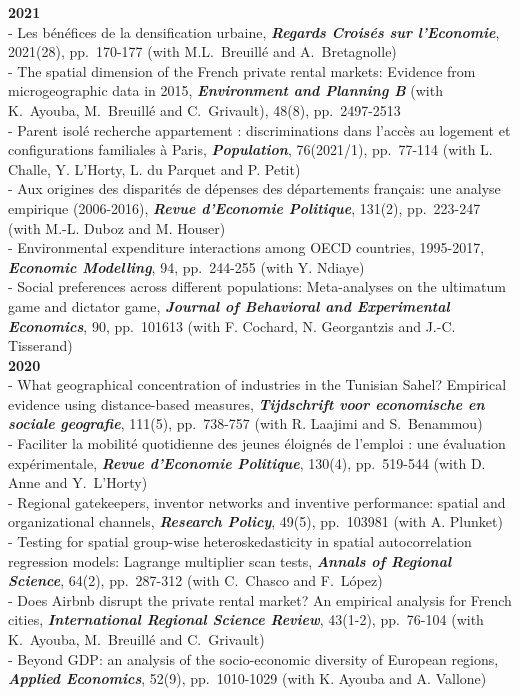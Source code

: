 \documentclass[a4paper,12pt]{article}
\begin{document}
\noindent \textbf{2021}  \smallskip \\ 
- Les bénéfices de la densification urbaine, \textit{\textbf{Regards Croisés sur l'Economie}}, 2021(28), pp.~170-177 (with M.L.~Breuillé and A.~Bretagnolle)\\
- The spatial dimension of the French private rental markets: Evidence from microgeographic data in 2015, \textit{\textbf{Environment and Planning B}} (with K.~Ayouba, M.~Breuillé and C.~Grivault), 48(8), pp.~2497-2513 \\
- Parent isolé recherche appartement : discriminations dans l'accès au logement et configurations familiales à Paris, \textit{\textbf{Population}}, 76(2021/1), pp.~77-114 (with L. Challe, Y. L'Horty, L. du Parquet and P. Petit) \\
- Aux origines des disparités de dépenses des départements fran\c cais: une analyse empirique (2006-2016), \textit{\textbf{Revue d'Economie Politique}}, 131(2), pp.~223-247 (with M.-L. Duboz and M. Houser) \\	
- Environmental expenditure interactions among OECD countries, 1995-2017, \textit{\textbf{Economic Modelling}}, 94, pp.~244-255 (with Y. Ndiaye) \\
- Social preferences across different populations: Meta-analyses on the ultimatum game and dictator game, \textit{\textbf{Journal of Behavioral and Experimental Economics}}, 90, pp.~101613 (with F. Cochard, N. Georgantzis and J.-C. Tisserand) \\

\noindent \textbf{2020}  \smallskip \\ 
- What geographical concentration of industries in the Tunisian Sahel? Empirical evidence using distance-based measures, \textit{\textbf{Tijdschrift voor economische en sociale geografie}}, 111(5), pp.~738-757  (with R. Laajimi and S.~Benammou) \\
- Faciliter la mobilité quotidienne des jeunes éloignés de l'emploi : une évaluation expérimentale, \textit{\textbf{Revue d'Economie Politique}}, 130(4), pp.~519-544 (with D. Anne and Y.~L'Horty)\\
- Regional gatekeepers, inventor networks and inventive performance: spatial and organizational channels, \textit{\textbf{Research Policy}}, 49(5), pp.~103981 (with A. Plunket) \\
- Testing for spatial group-wise heteroskedasticity in spatial autocorrelation regression models: Lagrange multiplier scan tests, \textit{\textbf{Annals of Regional Science}}, 64(2), pp.~287-312 (with C.~Chasco and F.~López) \\
- Does Airbnb disrupt the private rental market? An empirical analysis for French cities, \textit{\textbf{International Regional Science Review}}, 43(1-2), pp.~76-104 (with K.~Ayouba, M.~Breuillé and C.~Grivault) \\
- Beyond GDP: an analysis of the socio-economic diversity of European regions, \textit{\textbf{Applied Economics}}, 52(9), pp.~1010-1029 (with K. Ayouba and A. Vallone)\\
		
\end{document}
